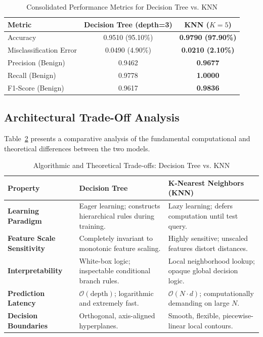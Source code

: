 \documentclass[12pt]{article}
\begin{document}
\begin{table}[H]
\centering
\caption{Consolidated Performance Metrics for Decision Tree vs. KNN}
\label{tab:comparison}
\vspace{0.2cm}
\begin{tabular}{lcc}
\toprule
\textbf{Metric} & \textbf{Decision Tree (depth=3)} & \textbf{KNN ($K=5$)} \\
\midrule
Accuracy                 & 0.9510 (95.10\%) & \textbf{0.9790 (97.90\%)} \\
Misclassification Error  & 0.0490 (4.90\%)  & \textbf{0.0210 (2.10\%)}  \\
Precision (Benign)       & 0.9462           & \textbf{0.9677}           \\
Recall (Benign)          & 0.9778           & \textbf{1.0000}           \\
F1-Score (Benign)        & 0.9617           & \textbf{0.9836}           \\
\bottomrule
\end{tabular}
\end{table}

\subsection{Architectural Trade-Off Analysis}
Table~\ref{tab:tradeoffs} presents a comparative analysis of the fundamental computational and theoretical differences between the two models.

\begin{table}[H]
\centering
\caption{Algorithmic and Theoretical Trade-offs: Decision Tree vs. KNN}
\label{tab:tradeoffs}
\vspace{0.2cm}
\begin{tabular}{p{4.2cm}p{5.5cm}p{5.5cm}}
\toprule
\textbf{Property} & \textbf{Decision Tree} & \textbf{K-Nearest Neighbors (KNN)} \\
\midrule
\textbf{Learning Paradigm} & Eager learning; constructs hierarchical rules during training. & Lazy learning; defers computation until test query. \\
\addlinespace
\textbf{Feature Scale Sensitivity} & Completely invariant to monotonic feature scaling. & Highly sensitive; unscaled features distort distances. \\
\addlinespace
\textbf{Interpretability} & White-box logic; inspectable conditional branch rules. & Local neighborhood lookup; opaque global decision logic. \\
\addlinespace
\textbf{Prediction Latency} & $\mathcal{O}(\text{depth})$; logarithmic and extremely fast. & $\mathcal{O}(N \cdot d)$; computationally demanding on large $N$. \\
\addlinespace
\textbf{Decision Boundaries} & Orthogonal, axis-aligned hyperplanes. & Smooth, flexible, piecewise-linear local contours. \\
\bottomrule
\end{tabular}
\end{table}
\end{document}
